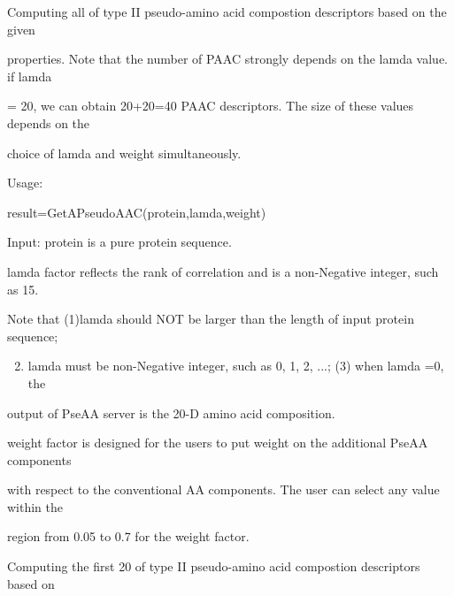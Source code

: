 \documentclass[letterpaper,10pt,english]{sphinxmanual}
\begin{document}

\begin{fulllineitems}
\label{reference/PseudoAAC:PseudoAAC.GetAPseudoAAC}
Computing all of type II pseudo-amino acid compostion descriptors based on the given

properties. Note that the number of PAAC strongly depends on the lamda value. if lamda

= 20, we can obtain 20+20=40 PAAC descriptors. The size of these values depends on the

choice of lamda and weight simultaneously.

Usage:

result=GetAPseudoAAC(protein,lamda,weight)

Input: protein is a pure protein sequence.

lamda factor reflects the rank of correlation and is a non-Negative integer, such as 15.

Note that (1)lamda should NOT be larger than the length of input protein sequence;
\begin{enumerate}
\setcounter{enumi}{1}
\item {} 
lamda must be non-Negative integer, such as 0, 1, 2, ...; (3) when lamda =0, the

\end{enumerate}

output of PseAA server is the 20-D amino acid composition.

weight factor is designed for the users to put weight on the additional PseAA components

with respect to the conventional AA components. The user can select any value within the

region from 0.05 to 0.7 for the weight factor.

\end{fulllineitems}


\begin{fulllineitems}
\label{reference/PseudoAAC:PseudoAAC.GetAPseudoAAC1}
Computing the first 20 of type II pseudo-amino acid compostion descriptors based on

\end{fulllineitems}
\end{document}
